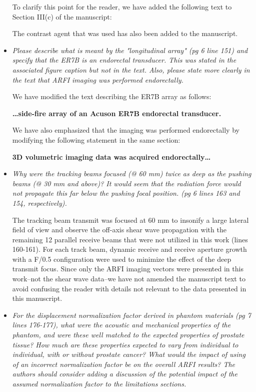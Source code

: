 \documentclass[10pt]{article}
\begin{document}
\begin{itemize}
    To clarify this point for the reader, we have added the following text to
    Section III(c) of the manuscript:

    \textbf{}

    The contrast agent that was used has also been added to the manuscript.

    \item \textit{Please describe what is meant by the "longitudinal array" (pg
            6 line 151) and specify that the ER7B is an endorectal transducer.
            This was stated in the associated figure caption but not in the
            text.  Also, please state more clearly in the text that ARFI
            imaging was performed endorectally.}

    We have modified the text describing the ER7B array as follows:

    \textbf{\ldots side-fire array of an Acuson ER7B endorectal transducer.}

    We have also emphasized that the imaging was performed endorectally by
    modifying the following statement in the same section:

    \textbf{3D volumetric imaging data was acquired endorectally\ldots}

    \item \textit{Why were the tracking beams focused (@ 60 mm) twice as deep
            as the pushing beams (@ 30 mm and above)?  It would seem that the
            radiation force would not propagate this far below the pushing
            focal position. (pg 6 lines 163 and 154, respectively).}

    The tracking beam transmit was focused at 60 mm to insonify a large lateral
    field of view and observe the off-axis shear wave propagation with the
    remaining 12 parallel receive beams that were not utilized in this work
    (lines 160-161). For each track beam, dynamic receive and receive aperture
    growth with a F/0.5 configuration were used to minimize the effect of the
    deep transmit focus.  Since only the ARFI imaging vectors were presented in
    this work--not the shear wave data--we have not amended the manuscript
    text to avoid confusing the reader with details not relevant to the data
    presented in this manuscript.

    \item \textit{For the displacement normalization factor derived in phantom
            materials (pg 7 lines 176-177), what were the acoustic and
            mechanical properties of the phantom, and were these well matched
            to the expected properties of prostate tissue?  How much are these
            properties expected to vary from individual to individual, with or
            without prostate cancer?  What would the impact of using of an
            incorrect normalization factor be on the overall ARFI results?  The
            authors should consider adding a discussion of the potential impact
            of the assumed normalization factor to the limitations sections.}


\end{itemize}
\end{document}
